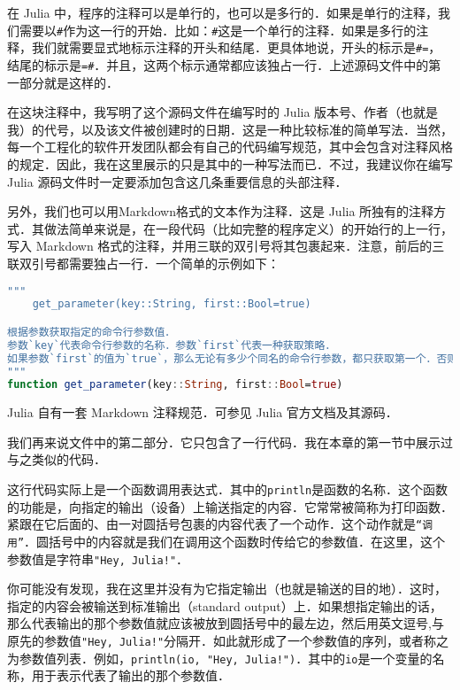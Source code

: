 在 Julia 中，程序的注释可以是单行的，也可以是多行的．如果是单行的注释，我们需要以\verb|#|作为这一行的开始．比如：\verb|#|这是一个单行的注释．如果是多行的注释，我们就需要显式地标示注释的开头和结尾．更具体地说，开头的标示是\verb|#=|，结尾的标示是\verb|=#|．并且，这两个标示通常都应该独占一行．上述源码文件中的第一部分就是这样的．

在这块注释中，我写明了这个源码文件在编写时的 Julia 版本号、作者（也就是我）的代号，以及该文件被创建时的日期．这是一种比较标准的简单写法．当然，每一个工程化的软件开发团队都会有自己的代码编写规范，其中会包含对注释风格的规定．因此，我在这里展示的只是其中的一种写法而已．不过，我建议你在编写 Julia 源码文件时一定要添加包含这几条重要信息的头部注释．

另外，我们也可以用Markdown格式的文本作为注释．这是 Julia 所独有的注释方式．其做法简单来说是，在一段代码（比如完整的程序定义）的开始行的上一行，写入 Markdown 格式的注释，并用三联的双引号将其包裹起来．注意，前后的三联双引号都需要独占一行．一个简单的示例如下：

\begin{lstlisting}[language=julia]
"""
    get_parameter(key::String, first::Bool=true)

根据参数获取指定的命令行参数值．
参数`key`代表命令行参数的名称．参数`first`代表一种获取策略．
如果参数`first`的值为`true`，那么无论有多少个同名的命令行参数，都只获取第一个．否则只获取最后一个．
"""
function get_parameter(key::String, first::Bool=true)
\end{lstlisting}

Julia 自有一套 Markdown 注释规范．可参见 Julia 官方文档及其源码．

我们再来说文件中的第二部分．它只包含了一行代码．我在本章的第一节中展示过与之类似的代码．

这行代码实际上是一个函数调用表达式．其中的\verb|println|是函数的名称．这个函数的功能是，向指定的输出（设备）上输送指定的内容．它常常被简称为打印函数．紧跟在它后面的、由一对圆括号包裹的内容代表了一个动作．这个动作就是\verb|“调用”|．圆括号中的内容就是我们在调用这个函数时传给它的参数值．在这里，这个参数值是字符串\verb|"Hey, Julia!"|．

你可能没有发现，我在这里并没有为它指定输出（也就是输送的目的地）．这时，指定的内容会被输送到标准输出（standard output）上．如果想指定输出的话，那么代表输出的那个参数值就应该被放到圆括号中的最左边，然后用英文逗号,与原先的参数值\verb|"Hey, Julia!"|分隔开．如此就形成了一个参数值的序列，或者称之为参数值列表．例如，\verb|println(io, "Hey, Julia!")|．其中的\verb|io|是一个变量的名称，用于表示代表了输出的那个参数值．

